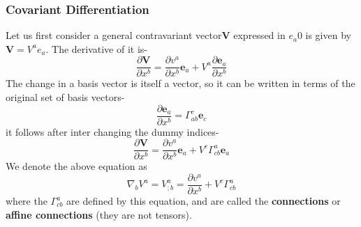 \documentclass[12pt,a4paper]{article}
\numberwithin{table}{section}
\numberwithin{figure}{section}
\numberwithin{equation}{section}
\theoremstyle{remark}
\theoremstyle{definition}
\begin{document}
\subsubsection{Covariant Differentiation}
Let us first consider a general contravariant vector$\textbf{V}$ expressed in $e_a0 $ is given by $\textbf{V}=V^ae_a$. The derivative of it is-
$$\dfrac{\partial \textbf{V}}{\partial x^b}=\dfrac{\partial v^a}{\partial x^b}\textbf{e}_a+ V^a\dfrac{\partial\textbf{e}_a}{\partial x^b}$$
The change in a basis vector is itself a vector, so it can be written in terms
of the original set of basis vectors-
$$\dfrac{\partial\textbf{e}_a}{\partial x^b}=\Gamma^c_{ab}\textbf{e}_c$$
it follows after inter changing the dummy indices-
$$\dfrac{\partial \textbf{V}}{\partial x^b}=\dfrac{\partial v^a}{\partial x^b}\textbf{e}_a+V^c\Gamma^a_{cb}\textbf{e}_a$$
We denote the above equation as
$$\nabla_bV^a=V^a_{;b}=\dfrac{\partial v^a}{\partial x^b}+V^c\Gamma^a_{cb} $$
where the $\Gamma^a_{cb}$ are defined by this equation, and are called the \textbf{connections} or \textbf{affine connections} (they are not tensors).
\end{document}
